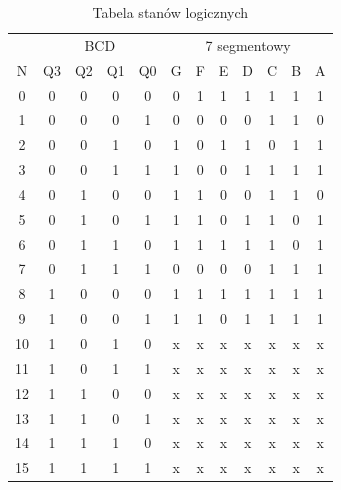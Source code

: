 \documentclass[a4paper,oneside]{report}
\begin{document}
\begin{table}[h] \caption{Tabela stanów logicznych} \label{decoder-table} \centering
\begin{tabular}{|c|cccc|ccccccc|} 
\hline 
& \multicolumn{4}{c|}{BCD} & \multicolumn{7}{c|}{7 segmentowy} \\
N  & Q3   & Q2   & Q1   & Q0  & G   & F  & E  & D  & C  & B  & A  \\ \hline
0  & 0    & 0    & 0    & 0   & 0   & 1  & 1  & 1  & 1  & 1  & 1  \\
1  & 0    & 0    & 0    & 1   & 0   & 0  & 0  & 0  & 1  & 1  & 0  \\
2  & 0    & 0    & 1    & 0   & 1   & 0  & 1  & 1  & 0  & 1  & 1  \\
3  & 0    & 0    & 1    & 1   & 1   & 0  & 0  & 1  & 1  & 1  & 1  \\
4  & 0    & 1    & 0    & 0   & 1   & 1  & 0  & 0  & 1  & 1  & 0  \\
5  & 0    & 1    & 0    & 1   & 1   & 1  & 0  & 1  & 1  & 0  & 1  \\
6  & 0    & 1    & 1    & 0   & 1   & 1  & 1  & 1  & 1  & 0  & 1  \\
7  & 0    & 1    & 1    & 1   & 0   & 0  & 0  & 0  & 1  & 1  & 1  \\
8  & 1    & 0    & 0    & 0   & 1   & 1  & 1  & 1  & 1  & 1  & 1  \\
9  & 1    & 0    & 0    & 1   & 1   & 1  & 0  & 1  & 1  & 1  & 1  \\
10 & 1    & 0    & 1    & 0   & x   & x  & x  & x  & x  & x  & x  \\
11 & 1    & 0    & 1    & 1   & x   & x  & x  & x  & x  & x  & x  \\
12 & 1    & 1    & 0    & 0   & x   & x  & x  & x  & x  & x  & x  \\
13 & 1    & 1    & 0    & 1   & x   & x  & x  & x  & x  & x  & x  \\
14 & 1    & 1    & 1    & 0   & x   & x  & x  & x  & x  & x  & x  \\
15 & 1    & 1    & 1    & 1   & x   & x  & x  & x  & x  & x  & x  \\ \hline
\end{tabular}
\end{table}
\end{document}
